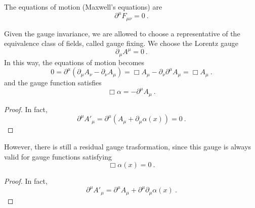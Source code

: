     The equations of motion (Maxwell's equations) are 
    \begin{equation*}
        \partial^\mu F_{\mu\nu} = 0 ~.
    \end{equation*}

    Given the gauge invariance, we are allowed to choose a representative of the equivalence class of fields, called gauge fixing. We choose the Lorentz gauge 
    \begin{equation*}
        \partial_\mu A^\mu = 0 ~.
    \end{equation*}
    In this way, the equations of motion becomes 
    \begin{equation*}
        0 = \partial^\mu (\partial_\mu A_\nu - \partial_\nu A_\mu) = \Box A_\mu - \partial_\nu \partial^\mu A_\mu = \Box A_\mu ~.
    \end{equation*}
    and the gauge function satisfies 
    \begin{equation*}
        \Box \alpha = - \partial^\mu A_\mu ~.
    \end{equation*}
    \begin{proof}
        In fact,
        \begin{equation*}
            \partial^\mu {A'}_\mu = \partial^\mu (A_\mu + \partial_\mu \alpha (x)) = 0 ~.
        \end{equation*}
    \end{proof}

    However, there is still a residual gauge trasformation, since this gauge is always valid for gauge functions satisfying 
    \begin{equation*}
        \Box \alpha (x) = 0~.
    \end{equation*}
    \begin{proof}
        In fact,
        \begin{equation*}
            \partial^\mu {A'}_\mu = \partial^\mu A_\mu + \partial^\mu \partial_\mu \alpha (x) ~.
        \end{equation*}
    \end{proof}


